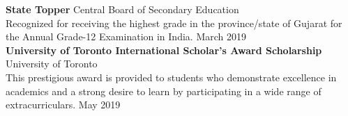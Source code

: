 \documentclass[a4paper]{article}
\begin{document}
\textbf{State Topper} \hfill Central Board of Secondary Education\\
Recognized for receiving the highest grade in the province/state of Gujarat for the Annual Grade-12 Examination in India. \hfill March 2019\\
\vspace*{2mm}
\textbf{University of Toronto International Scholar’s Award Scholarship} \hfill University of Toronto\\
This prestigious award is provided to students who demonstrate excellence in academics and a strong desire to learn by participating in a wide range of extracurriculars. \hfill May 2019\\
\vspace*{2mm}

\ 
\end{document}
